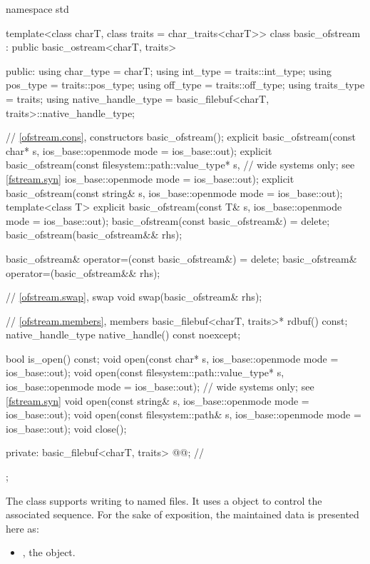 %
\begin{codeblock}
namespace std {
  template<class charT, class traits = char_traits<charT>>
  class basic_ofstream : public basic_ostream<charT, traits> {
  public:
    using char_type   = charT;
    using int_type    = traits::int_type;
    using pos_type    = traits::pos_type;
    using off_type    = traits::off_type;
    using traits_type = traits;
    using native_handle_type = basic_filebuf<charT, traits>::native_handle_type;

    // \ref{ofstream.cons}, constructors
    basic_ofstream();
    explicit basic_ofstream(const char* s,
                            ios_base::openmode mode = ios_base::out);
    explicit basic_ofstream(const filesystem::path::value_type* s,  // wide systems only; see \ref{fstream.syn}
                            ios_base::openmode mode = ios_base::out);
    explicit basic_ofstream(const string& s,
                            ios_base::openmode mode = ios_base::out);
    template<class T>
      explicit basic_ofstream(const T& s, ios_base::openmode mode = ios_base::out);
    basic_ofstream(const basic_ofstream&) = delete;
    basic_ofstream(basic_ofstream&& rhs);

    basic_ofstream& operator=(const basic_ofstream&) = delete;
    basic_ofstream& operator=(basic_ofstream&& rhs);

    // \ref{ofstream.swap}, swap
    void swap(basic_ofstream& rhs);

    // \ref{ofstream.members}, members
    basic_filebuf<charT, traits>* rdbuf() const;
    native_handle_type native_handle() const noexcept;

    bool is_open() const;
    void open(const char* s, ios_base::openmode mode = ios_base::out);
    void open(const filesystem::path::value_type* s,
              ios_base::openmode mode = ios_base::out);     // wide systems only; see \ref{fstream.syn}
    void open(const string& s, ios_base::openmode mode = ios_base::out);
    void open(const filesystem::path& s, ios_base::openmode mode = ios_base::out);
    void close();

  private:
    basic_filebuf<charT, traits> @@;    // \expos
  };
}
\end{codeblock}

\pnum
The class
supports writing to named files.
It uses a
object to control the associated
sequence.
For the sake of exposition, the maintained data is presented here as:
\begin{itemize}
\item
{}, the  object.
\end{itemize}

